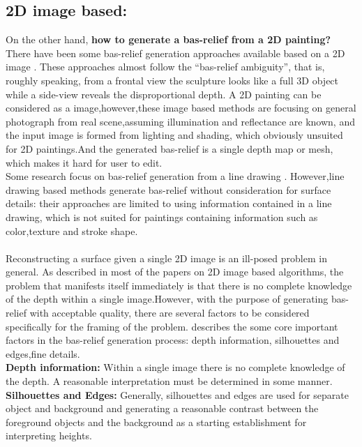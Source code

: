 \subsection{2D image based:}\label{2dimagebased} On the other hand,\textbf{ how to generate a bas-relief from a 2D painting?} \\ There have been some bas-relief generation approaches available based on a 2D image \cite{zeng2014region}\cite{wu2013making}  \cite{alexa2010reliefs}\cite{wu2008interactive}.  These approaches almost follow the “bas-relief ambiguity”\cite{belhumeur1999bas}, that is, roughly speaking, from a frontal view the sculpture looks like a full 3D object while a side-view reveals the disproportional depth. 
A 2D painting can be considered as a image,however,these image based methods are focusing on general photograph from real scene,assuming illumination and reflectance are known, and the input image is formed from lighting and shading, which obviously unsuited for 2D paintings.And the generated bas-relief is a single depth map or mesh, which makes it hard for user to edit. \\
Some research focus on bas-relief generation from a line drawing \cite{kolomenkin2011reconstruction}\cite{varley2002estimating}\cite{malik1987interpreting}\cite{sykora2014ink}. However,line drawing based methods generate bas-relief without consideration for surface details: their approaches are limited to using information contained in a line drawing, which is not suited for paintings containing information such as color,texture and stroke shape. \\ \\
Reconstructing a surface given a single 2D image is an ill-posed problem in general. As described in most of the papers on 2D image based algorithms, the problem that manifests itself immediately is that there is no complete knowledge of the depth within a single image.However, with the purpose of generating bas-relief with acceptable quality, there are several factors to be considered specifically for the framing of the problem.\cite{benzaid2017analysis} describes the some core important factors in the bas-relief generation process: depth information, silhouettes and edges,fine details.\\
\textbf{Depth information:} Within a single image there is no complete knowledge of the depth. A reasonable interpretation must be determined in some manner. \\ 
\textbf{Silhouettes and Edges:} Generally, silhouettes and edges are used for separate object and background and generating a reasonable contrast between the foreground objects and the background as a starting establishment for interpreting heights. \\

